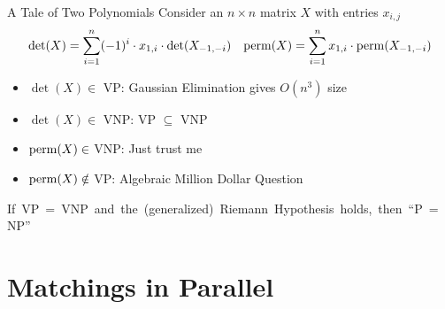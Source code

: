 \documentclass[aspectratio=169]{beamer}
\begin{document}
\begin{frame}{A Tale of Two Polynomials}
        \vspace{-15pt}
    Consider an $n \times n$ matrix $X$ with entries $x_{i, j}$
    \begin{align*}
        \det(X) = \sum_{i = 1}^n (-1)^i \cdot x_{1, i} \cdot \det(X_{-1, -i}) && \operatorname{perm}(X) = \sum_{i = 1}^n x_{1, i} \cdot \operatorname{perm}(X_{-1, -i}) 
    \end{align*} \pause
    \vspace{-15pt}
    \begin{itemize}
        \item $\det(X) \in$ VP: Gaussian Elimination gives $O(n^3)$ size \pause
        \item $\det(X) \in$ VNP: VP $\subseteq$ VNP \pause
        \item $\operatorname{perm}(X) \in$ VNP: Just trust me \pause
        \item \textcolor{sigma@alertred}{$\operatorname{perm}(X) \notin$ VP}: Algebraic Million Dollar Question
    \end{itemize}
    \mbox{If VP = VNP and the (generalized) Riemann Hypothesis holds, then ``P = NP''}
    \cite{burg}
\end{frame}

\section{Matchings in Parallel}
\frame{\sectionpage}
\end{document}
